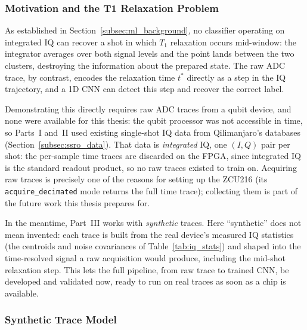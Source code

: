 \subsubsection{Motivation and the T1 Relaxation Problem}

As established in Section~\ref{subsec:ml_background}, no classifier operating on
integrated IQ can recover a shot in which $T_1$ relaxation occurs mid-window: the
integrator averages over both signal levels and the point lands between the two
clusters, destroying the information about the prepared state.  The raw ADC trace,
by contrast, encodes the relaxation time $t^*$ directly as a step in the IQ
trajectory, and a 1D CNN can detect this step and recover the correct label.

Demonstrating this directly requires raw ADC traces from a qubit device, and none
were available for this thesis: the qubit
processor was not accessible in time, so Parts~I and~II used existing single-shot
IQ data from Qilimanjaro's databases (Section~\ref{subsec:ssro_data}).  That data
is \emph{integrated} IQ, one $(I,Q)$ pair per shot: the per-sample time traces are
discarded on the FPGA, since integrated IQ is the standard readout product, so no
raw traces existed to train on.  Acquiring raw traces
is precisely one of the reasons for setting up the ZCU216 (its
\texttt{acquire\_decimated} mode returns the full time trace); collecting them is
part of the future work this thesis prepares for.

In the meantime, Part~III works with \emph{synthetic} traces.  Here ``synthetic''
does not mean invented: each trace is built from the real device's measured IQ
statistics (the centroids and noise covariances of Table~\ref{tab:iq_stats}) and
shaped into the time-resolved signal a raw acquisition would produce, including the
mid-shot relaxation step.  This lets the full pipeline, from raw
trace to trained CNN, be developed and validated now, ready to run on
real traces as soon as a chip is available.

\subsubsection{Synthetic Trace Model}

